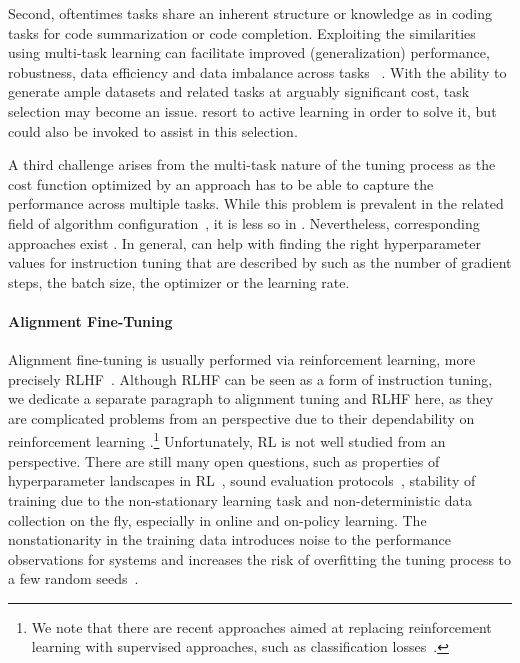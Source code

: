 \documentclass[10pt]{article} %
\begin{document}
Second, oftentimes tasks share an inherent structure or knowledge as in coding tasks for code summarization or code completion. 
Exploiting the similarities using multi-task learning can facilitate improved (generalization) performance, robustness, data efficiency and data imbalance across tasks ~\citep{liu-arxiv23a}.
With the ability to generate ample datasets and related tasks at arguably significant cost, task selection may become an issue.  
\citet{kung-emnlp23a} resort to active learning in order to solve it, but \AutoML could also be invoked to assist in this selection.


A third challenge arises from the multi-task nature of the tuning process as the cost function optimized by an \AutoML approach has to be able to capture the performance across multiple tasks. 
While this problem is prevalent in the related field of algorithm configuration~\citep{schede-jair22a}, it is less so in \AutoML. 
Nevertheless, corresponding approaches exist \citep{perrone-neurips18a,law-neurips19a,li-kdd22a}. 
In general, \AutoML can help with finding the right hyperparameter values for instruction tuning that are described by \citet{wei-iclr22a} such as the number of gradient steps, the batch size, the optimizer or the learning rate.

\paragraph{Alignment Fine-Tuning}
Alignment fine-tuning is usually performed via reinforcement learning, more precisely RLHF~\citep{fernandes-arxiv23a}. Although RLHF can be seen as a form of instruction tuning, we dedicate a separate paragraph to alignment tuning and RLHF here, as they are complicated problems from an \AutoML perspective due to their dependability on reinforcement learning \citep{eimer-icml23a}.\footnote{We note that there are recent approaches aimed at replacing reinforcement learning with supervised approaches, such as classification losses~\citep{rafailov-arxiv23a}.} 
Unfortunately, RL is not well studied from an \AutoML perspective. 
There are still many open questions, such as properties of hyperparameter landscapes in RL~\citep{mohan-automlconf23a}, sound evaluation protocols~\citep{eimer-icml23a}, stability of training due to the non-stationary learning task and non-deterministic data collection on the fly, especially in online and on-policy learning. 
The nonstationarity in the training data introduces noise to the performance observations for \AutoML systems and increases the risk of overfitting the tuning process to a few random seeds~\citep{eimer-icml23a}.
\end{document}
